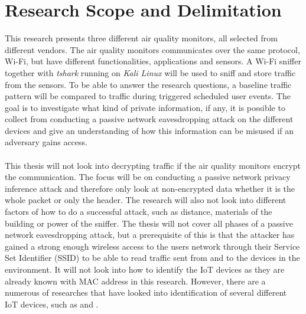\section{Research Scope and Delimitation}
This research presents three different air quality monitors, all selected from different vendors. The air quality monitors communicates over the same protocol, Wi-Fi, but have different functionalities, applications and sensors. A Wi-Fi sniffer together with \textit{tshark} running on \textit{Kali Linux} will be used to sniff and store traffic from the sensors. To be able to answer the research questions, a baseline traffic pattern will be compared to traffic during triggered scheduled user events. The goal is to investigate what kind of private information, if any, it is possible to collect from conducting a passive network eavesdropping attack on the different devices and give an understanding of how this information can be misused if an adversary gains access. 
\\\\
This thesis will not look into decrypting traffic if the air quality monitors encrypt the communication. The focus will be on conducting a passive network privacy inference attack and therefore only look at non-encrypted data whether it is the whole packet or only the header. The research will also not look into different factors of how to do a successful attack, such as distance, materials of the building or power of the sniffer. The thesis will not cover all phases of a passive network eavesdropping attack, but a prerequisite of this is that the attacker has gained a strong enough wireless access to the users network through their Service Set Identifier (SSID) to be able to read traffic sent from and to the devices in the environment. It will not look into how to identify the IoT devices as they are already known with MAC address in this research. However, there are a numerous of researches that have looked into identification of several different IoT devices, such as \cite{IdentifyIoT1} and \cite{IdentifyingIoT2}. 

